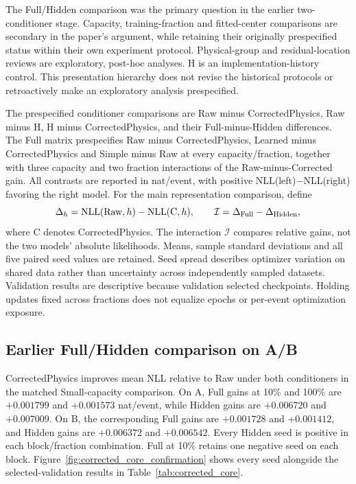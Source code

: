 The Full/Hidden comparison was the primary question in the earlier two-conditioner stage.
Capacity, training-fraction and fitted-center comparisons are secondary in the
paper's argument, while retaining their originally prespecified status within
their own experiment protocol. Physical-group and residual-location reviews
are exploratory, post-hoc analyses. H is an implementation-history control.
This presentation hierarchy does not revise the historical protocols or
retroactively make an exploratory analysis prespecified.

The prespecified conditioner comparisons are Raw minus CorrectedPhysics, Raw
minus H, H minus CorrectedPhysics, and their Full-minus-Hidden differences.
The Full matrix prespecifies Raw minus CorrectedPhysics, Learned minus
CorrectedPhysics and Simple minus Raw at every capacity/fraction, together
with three capacity and two fraction interactions of the Raw-minus-Corrected
gain. All contrasts are reported in nat/event, with positive
NLL(left)$-$NLL(right) favoring the right model. For the main representation
comparison, define
\begin{equation}
 \Delta_h=\mathrm{NLL}(\mathrm{Raw},h)-\mathrm{NLL}(\mathrm{C},h),\qquad
 \mathcal I=\Delta_{\rm Full}-\Delta_{\rm Hidden},
 \label{eq:earlier_contrast}
\end{equation}
where C denotes CorrectedPhysics. The interaction $\mathcal I$ compares relative gains,
not the two models' absolute likelihoods. Means, sample standard deviations
and all five paired seed values are retained. Seed spread describes optimizer
variation on shared data rather than uncertainty across independently sampled
datasets. Validation results are descriptive because validation selected
checkpoints. Holding updates fixed across fractions does not equalize epochs
or per-event optimization exposure.



\subsection{Earlier Full/Hidden comparison on A/B}
\label{sec:conditioner_results}

CorrectedPhysics improves mean NLL relative to Raw under both conditioners in
the matched Small-capacity comparison. On A, Full gains at 10\% and 100\%
are $+0.001799$ and $+0.001573$ nat/event, while Hidden gains are $+0.006720$
and $+0.007009$. On B, the corresponding Full gains are $+0.001728$ and
$+0.001412$, and Hidden gains are $+0.006372$ and $+0.006542$.
Every Hidden seed is positive in each block/fraction combination. Full at
10\% retains one negative seed on each block. Figure~\ref{fig:corrected_core_confirmation}
shows every seed alongside the selected-validation results in
Table~\ref{tab:corrected_core}.

